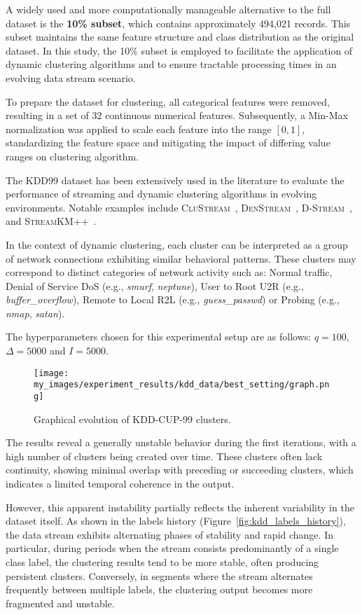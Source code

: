 A widely used and more computationally manageable alternative to the full
dataset is the \textbf{10\% subset}, which contains approximately 494,021
records. This subset maintains the same feature structure and class
distribution as the original dataset. In this study, the 10\% subset is
employed to facilitate the application of dynamic clustering algorithms and to
ensure tractable processing times in an evolving data stream scenario.

To prepare the dataset for clustering, all categorical features were removed,
resulting in a set of 32 continuous numerical features. Subsequently, a Min-Max
normalization was applied to scale each feature into the range $[0,1]$,
standardizing the feature space and mitigating the impact of differing value
ranges on clustering algorithm.

The KDD99 dataset has been extensively used in the literature to evaluate the
performance of streaming and dynamic clustering algorithms in evolving
environments. Notable examples include \textsc{CluStream}~\cite{clustream},
\textsc{DenStream}~\cite{denstream}, \textsc{D-Stream}~\cite{d_stream}, and
\textsc{Stream\-KM++}~\cite{stream_km_plus_plus}.

In the context of dynamic clustering, each cluster can be interpreted as a
group of network connections exhibiting similar behavioral patterns. These
clusters may correspond to distinct categories of network activity such as:
Normal traffic, Denial of Service DoS (e.g., \emph{smurf}, \emph{neptune}),
User to Root U2R (e.g., \emph{buffer\_overflow}), Remote to Local R2L (e.g.,
\emph{guess\_passwd}) or Probing (e.g., \emph{nmap}, \emph{satan}).

The hyperparameters chosen for this experimental setup are as follows: $q =
      100$, $\Delta = 5000$ and $I=5000$.

\begin{figure}[H]
      \centering
      \texttt{[image: my\_images/experiment\_results/kdd\_data/best\_setting/graph.png]}
      \caption{Graphical evolution of KDD-CUP-99 clusters.}
\end{figure}

The results reveal a generally unstable behavior during the first iterations,
with a high number of clusters being created over time. These clusters often
lack continuity, showing minimal overlap with preceding or succeeding clusters,
which indicates a limited temporal coherence in the output.

However, this apparent instability partially reflects the inherent variability
in the dataset itself. As shown in the labels history
(Figure~\ref{fig:kdd_labels_history}), the data stream exhibits alternating
phases of stability and rapid change. In particular, during periods when the
stream consists predominantly of a single class label, the clustering results
tend to be more stable, often producing persistent clusters. Conversely, in
segments where the stream alternates frequently between multiple labels, the
clustering output becomes more fragmented and unstable.

